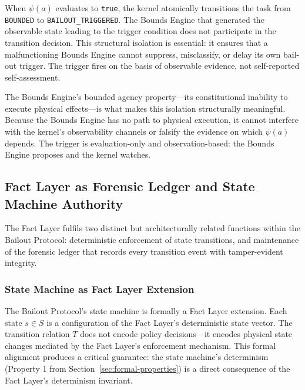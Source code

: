 When $\psi(a)$ evaluates to \texttt{true}, the kernel atomically transitions the task from \texttt{BOUNDED} to \texttt{BAILOUT\_TRIGGERED}. The Bounds Engine that generated the observable state leading to the trigger condition does not participate in the transition decision. This structural isolation is essential: it ensures that a malfunctioning Bounds Engine cannot suppress, misclassify, or delay its own bail-out trigger. The trigger fires on the basis of observable evidence, not self-reported self-assessment.

The Bounds Engine's bounded agency property---its constitutional inability to execute physical effects---is what makes this isolation structurally meaningful. Because the Bounds Engine has no path to physical execution, it cannot interfere with the kernel's observability channels or falsify the evidence on which $\psi(a)$ depends. The trigger is evaluation-only and observation-based: the Bounds Engine proposes and the kernel watches.

\subsection{Fact Layer as Forensic Ledger and State Machine Authority}
\label{sec:fact-ledger}

The Fact Layer fulfils two distinct but architecturally related functions within the Bailout Protocol: deterministic enforcement of state transitions, and maintenance of the forensic ledger that records every transition event with tamper-evident integrity.

\subsubsection{State Machine as Fact Layer Extension}
\label{sec:state-machine}

The Bailout Protocol's state machine is formally a Fact Layer extension. Each state $s \in S$ is a configuration of the Fact Layer's deterministic state vector. The transition relation $T$ does not encode policy decisions---it encodes physical state changes mediated by the Fact Layer's enforcement mechanism. This formal alignment produces a critical guarantee: the state machine's determinism (Property 1 from Section~\ref{sec:formal-properties}) is a direct consequence of the Fact Layer's determinism invariant.

